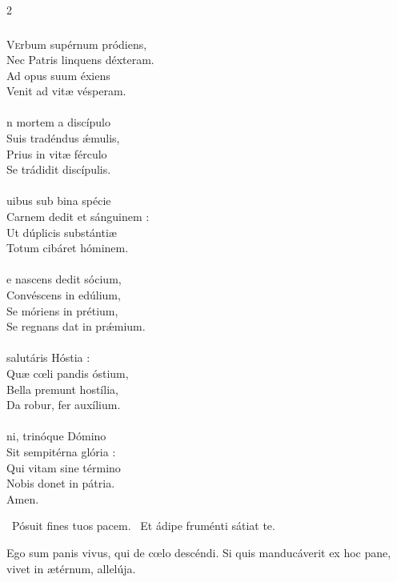 \documentclass[9pt,twoside]{extarticle}
\begin{document}
\begin{multicols}{2}
{\subsubsection*{\center {}}
\begin{center}\end{center}
\lettrine{V}erbum supérnum pródiens,\\
Nec Patris linquens déxteram.\\
Ad opus suum éxiens\\
Venit ad vitæ vésperam.\\
\\
n mortem a discípulo\\
Suis tradéndus ǽmulis,\\
Prius in vitæ férculo\\
Se trádidit discípulis.\\
\\
uibus sub bina spécie\\
Carnem dedit et sánguinem :\\
Ut dúplicis substántiæ\\
Totum cibáret hóminem.\\
\\
e nascens dedit sócium,\\
Convéscens in edúlium,\\
Se móriens in prétium,\\
Se regnans dat in prǽmium.\\
\\
 salutáris Hóstia :\\
Quæ cœli pandis óstium,\\
Bella premunt hostília,\\
Da robur, fer auxílium.\\
\\
ni, trinóque Dómino\\
Sit sempitérna glória :\\
Qui vitam sine término\\
Nobis donet in pátria.\\
Amen.

\begin{tightlist}{}
\item {}~Pósuit fines tuos pacem. ~Et ádipe fruménti sátiat te.
\item {} Ego sum panis vivus, qui de cœlo descéndi. Si quis manducáverit ex hoc pane, vivet in ætérnum, allelúja.
\end{tightlist}

}
\end{multicols}
\end{document}
